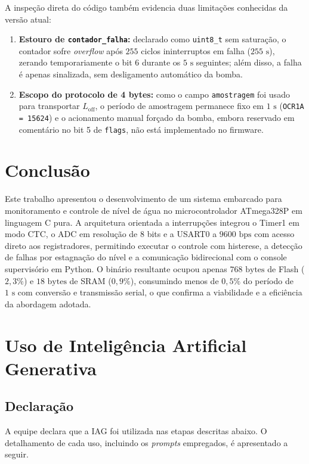 \documentclass[conference]{IEEEtran}
\begin{document}
A inspeção direta do código também evidencia duas limitações conhecidas da versão atual:
\begin{enumerate}
	\item \textbf{Estouro de \texttt{contador\_falha}:} declarado como \texttt{uint8\_t} sem saturação, o contador sofre \textit{overflow} após $255$ ciclos ininterruptos em falha ($255\text{ s}$), zerando temporariamente o bit 6 durante os $5\text{ s}$ seguintes; além disso, a falha é apenas sinalizada, sem desligamento automático da bomba.
	\item \textbf{Escopo do protocolo de 4 bytes:} como o campo \texttt{amostragem} foi usado para transportar $L_{\text{off}}$, o período de amostragem permanece fixo em $1\text{ s}$ (\texttt{OCR1A = 15624}) e o acionamento manual forçado da bomba, embora reservado em comentário no bit 5 de \texttt{flags}, não está implementado no firmware.
\end{enumerate}

\section{Conclusão}
Este trabalho apresentou o desenvolvimento de um sistema embarcado para monitoramento e controle de nível de água no microcontrolador ATmega328P em linguagem C pura. A arquitetura orientada a interrupções integrou o Timer1 em modo CTC, o ADC em resolução de 8 bits e a USART0 a $9600\text{ bps}$ com acesso direto aos registradores, permitindo executar o controle com histerese, a detecção de falhas por estagnação do nível e a comunicação bidirecional com o console supervisório em Python. O binário resultante ocupou apenas $768\text{ bytes}$ de Flash ($2{,}3\%$) e $18\text{ bytes}$ de SRAM ($0{,}9\%$), consumindo menos de $0{,}5\%$ do período de $1\text{ s}$ com conversão e transmissão serial, o que confirma a viabilidade e a eficiência da abordagem adotada.

\appendices

\section{Uso de Inteligência Artificial Generativa}

\subsection*{Declaração}
A equipe declara que a IAG foi utilizada nas etapas descritas abaixo. O detalhamento de cada uso, incluindo os \textit{prompts} empregados, é apresentado a seguir.
\end{document}
